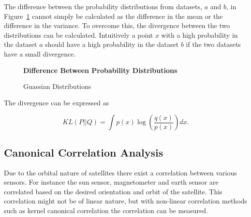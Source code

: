 The difference between the probability distributions from datasets, $a$ and $b$, in Figure~\ref{Guassian plot} cannot simply be calculated as the difference in the mean or the difference in the variance. To overcome this, the divergence between the two distributions can be calculated. Intuitively a point $x$ with a high probability in the dataset $a$ should have a high probability in the dataset $b$ if the two datasets have a small divergence. 

\begin{figure}[!h]
\centering
\textbf{Difference Between Probability Distributions}
\caption{Guassian Distributions}
\label{Guassian plot}
\end{figure}

The divergence can be expressed as 

\begin{equation}
KL(P\lvert\lvert Q) = \int p(x) \log \left( \frac{q(x)}{p(x)} \right)dx.
\end{equation}

\subsection{Canonical Correlation Analysis}
Due to the orbital nature of satellites there exist a correlation between various sensors. For instance the sun sensor, magnetometer and earth sensor are correlated based on the desired orientation and orbit of the satellite. This correlation might not be of linear nature, but with non-linear correlation methods such as kernel canonical correlation the correlation can be measured.

